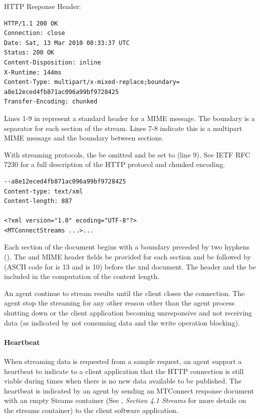 HTTP Response Header:
\begin{lstlisting}[firstnumber=1,escapechar=|,%
    caption={HTTP Response header},label={lst:http-response-header}]
HTTP/1.1 200 OK
Connection: close
Date: Sat, 13 Mar 2010 08:33:37 UTC
Status: 200 OK
Content-Disposition: inline
X-Runtime: 144ms
Content-Type: multipart/x-mixed-replace;boundary=
a8e12eced4fb871ac096a99bf9728425
Transfer-Encoding: chunked
\end{lstlisting}

Lines 1-9 in  represent a standard header for a MIME  message.  The boundary is a separator for each section of the stream. Lines 7-8 indicate this is a multipart MIME message and the boundary between sections. 

With streaming protocols, the  \MUST be omitted and  \MUST be set to  (line 9). See IETF RFC 7230 for a full description of the HTTP protocol and chunked encoding.
\begin{lstlisting}[firstnumber=10,escapechar=|,%
    caption={HTTP Response header 2},label={lst:http-response-header-2}]
--a8e12eced4fb871ac096a99bf9728425
Content-type: text/xml
Content-length: 887

<?xml version="1.0" ecoding="UTF-8"?>
<MTConnectStreams ...>...
\end{lstlisting}

Each section of the document begins with a boundary preceded by two hyphens (\cfont{--}). The  and  MIME header fields \MUST be provided for each section and \MUST be followed by  (ASCII code for  is 13 and  is 10) before the \gls{xml} document. The header and the  \MUSTNOT be included in the computation of the content length.

An \gls{agent} \MUST continue to stream results until the client closes the connection.  The \gls{agent} \MUSTNOT stop the streaming for any other reason other than the \gls{agent} process shutting down or the client application becoming unresponsive and not receiving data (as indicated by not consuming data and the write operation blocking).

\paragraph{Heartbeat}\mbox{}

When \gls{streaming data} is requested from a \gls{sample request}, an \gls{agent} \MUST support a \gls{heartbeat} to indicate to a client application that the HTTP connection is still viable during times when there is no new data available to be published.  The \gls{heartbeat} is indicated by an \gls{agent} by sending an MTConnect \gls{response document} with an empty Steams container (See , \textit{Section 4.1 Streams} for more details on the \gls{streams} container) to the client software application.

